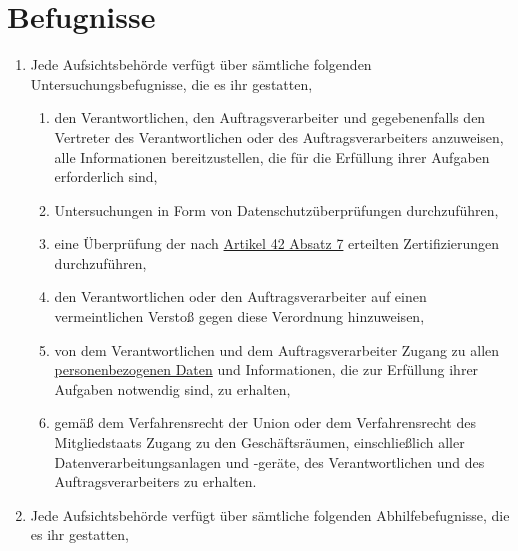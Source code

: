 \chapter{Befugnisse}
\label{ch:58}


\begin{enumerate}

  \item Jede Aufsichtsbehörde verfügt über sämtliche folgenden Untersuchungsbefugnisse, die es ihr gestatten,
  \label{itm:58-1}

  \begin{enumerate}
  
    \item den Verantwortlichen, den Auftragsverarbeiter und gegebenenfalls den Vertreter des Verantwortlichen oder des
     Auftragsverarbeiters anzuweisen, alle Informationen bereitzustellen, die für die Erfüllung ihrer Aufgaben
     erforderlich sind,
    \label{itm:58-1a}

    \item Untersuchungen in Form von Datenschutzüberprüfungen durchzuführen,
    \label{itm:581b}

    \item eine Überprüfung der nach \hyperref[itm:42-7]{Artikel 42 Absatz 7} erteilten Zertifizierungen durchzuführen,
    \label{itm:58-1c}

    \item den Verantwortlichen oder den Auftragsverarbeiter auf einen vermeintlichen Verstoß gegen diese Verordnung
     hinzuweisen,
    \label{itm:58-1d}

    \item von dem Verantwortlichen und dem Auftragsverarbeiter Zugang zu allen \hyperref[itm:04-1]{personenbezogenen Daten} und
     Informationen, die zur Erfüllung ihrer Aufgaben notwendig sind, zu erhalten,
    \label{itm:58-1e}

    \item gemäß dem Verfahrensrecht der Union oder dem Verfahrensrecht des Mitgliedstaats Zugang zu den Geschäftsräumen,
     einschließlich aller Datenverarbeitungsanlagen und -geräte, des Verantwortlichen und des Auftragsverarbeiters zu
     erhalten.
    \label{itm:58-1f}

  \end{enumerate}

  \item Jede Aufsichtsbehörde verfügt über sämtliche folgenden Abhilfebefugnisse, die es ihr gestatten,
  \label{itm:58-2}


\end{enumerate}
